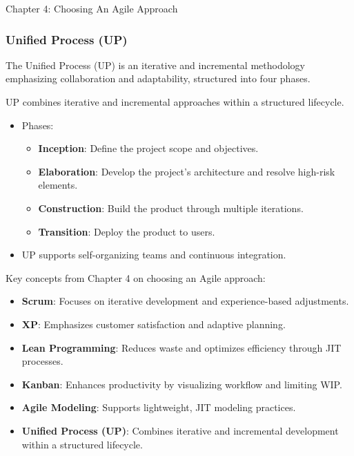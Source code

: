 \begin{notes}{Chapter 4: Choosing An Agile Approach}
\begin{highlight}
    \end{highlight}
    
    \subsubsection*{Unified Process (UP)}
    
    The Unified Process (UP) is an iterative and incremental methodology emphasizing collaboration and adaptability, structured into four phases.
    
    \begin{highlight}
    
        UP combines iterative and incremental approaches within a structured lifecycle.
        
        \begin{itemize}
            \item Phases:
            \begin{itemize}
                \item \textbf{Inception}: Define the project scope and objectives.
                \item \textbf{Elaboration}: Develop the project's architecture and resolve high-risk elements.
                \item \textbf{Construction}: Build the product through multiple iterations.
                \item \textbf{Transition}: Deploy the product to users.
            \end{itemize}
            \item UP supports self-organizing teams and continuous integration.
        \end{itemize}
    
    \end{highlight}
    
    \begin{highlight}
    
        Key concepts from Chapter 4 on choosing an Agile approach:
        
        \begin{itemize}
            \item \textbf{Scrum}: Focuses on iterative development and experience-based adjustments.
            \item \textbf{XP}: Emphasizes customer satisfaction and adaptive planning.
            \item \textbf{Lean Programming}: Reduces waste and optimizes efficiency through JIT processes.
            \item \textbf{Kanban}: Enhances productivity by visualizing workflow and limiting WIP.
            \item \textbf{Agile Modeling}: Supports lightweight, JIT modeling practices.
            \item \textbf{Unified Process (UP)}: Combines iterative and incremental development within a structured lifecycle.
        \end{itemize}
        

\end{highlight}
\end{notes}
